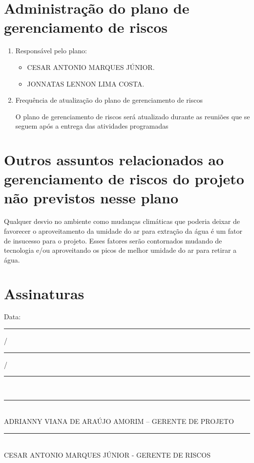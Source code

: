 \documentclass[12pt,openright,oneside,a4paper,brazil]{abntex2}
\begin{document}
\section{Administração do plano de gerenciamento de riscos}
\begin{enumerate}
\item Responsável pelo plano:
\begin{itemize}
\item CESAR ANTONIO MARQUES JÚNIOR.
\item JONNATAS LENNON LIMA COSTA.
\end{itemize}
\item Frequência de atualização do plano de gerenciamento de riscos

O plano de gerenciamento de riscos será atualizado durante as reuniões que se seguem após a entrega das atividades programadas
\end{enumerate}

\section{Outros assuntos relacionados ao gerenciamento de riscos do projeto não previstos nesse plano}
Qualquer desvio no ambiente como mudanças climáticas que poderia deixar de favorecer o aproveitamento da umidade do ar para extração da água é um fator de insucesso para o projeto. Esses fatores serão contornados mudando de tecnologia e/ou aproveitando os picos de melhor umidade do ar para retirar a água.

\section{Assinaturas}
\begin{center}
Data: \rule{0.5cm}{0.1mm}/\rule{0.5cm}{0.1mm}/\rule{1cm}{0.1mm}     \\
\rule{13cm}{0.1mm}\\
ADRIANNY VIANA DE ARAÚJO AMORIM – GERENTE DE PROJETO\\
\rule{13cm}{0.1mm}\\
CESAR ANTONIO MARQUES JÚNIOR - GERENTE DE RISCOS


\end{center}
\end{document}
